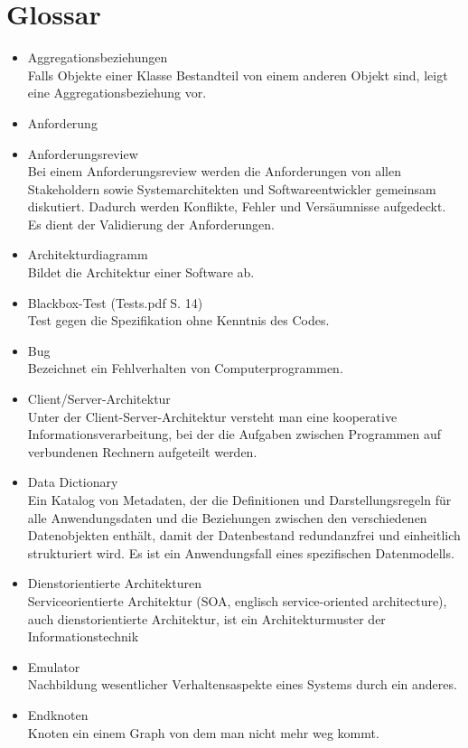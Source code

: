 \chapter{Glossar}
\begin{itemize}
\item 	Aggregationsbeziehungen\\
Falls Objekte einer Klasse Bestandteil von einem anderen Objekt sind, leigt eine Aggregationsbeziehung vor.
\item 	Anforderung
\item 	Anforderungsreview\\
Bei einem Anforderungsreview werden die Anforderungen von allen Stakeholdern sowie Systemarchitekten und Softwareentwickler gemeinsam diskutiert. Dadurch werden Konflikte, Fehler und Versäumnisse aufgedeckt. Es dient der Validierung der Anforderungen.
\item 	Architekturdiagramm\\
Bildet die Architektur einer Software ab.
\item 	Blackbox-Test (Tests.pdf S. 14)\\
Test gegen die Spezifikation ohne Kenntnis des Codes.
\item 	Bug\\
Bezeichnet ein Fehlverhalten von Computerprogrammen.
\item 	Client/Server-Architektur\\
Unter der Client-Server-Architektur versteht man eine kooperative Informationsverarbeitung, bei der die Aufgaben zwischen Programmen auf verbundenen Rechnern aufgeteilt werden.
\item 	Data Dictionary\\
Ein Katalog von Metadaten, der die Definitionen und Darstellungsregeln für alle Anwendungsdaten und die Beziehungen zwischen den verschiedenen Datenobjekten enthält, damit der Datenbestand redundanzfrei und einheitlich strukturiert wird. Es ist ein Anwendungsfall eines spezifischen Datenmodells.
\item 	Dienstorientierte Architekturen\\
Serviceorientierte Architektur (SOA, englisch service-oriented architecture), auch dienstorientierte Architektur, ist ein Architekturmuster der Informationstechnik
\item 	Emulator\\
Nachbildung wesentlicher Verhaltensaspekte eines Systems durch ein anderes.
\item 	Endknoten\\
Knoten ein einem Graph von dem man nicht mehr weg kommt.

\end{itemize}
